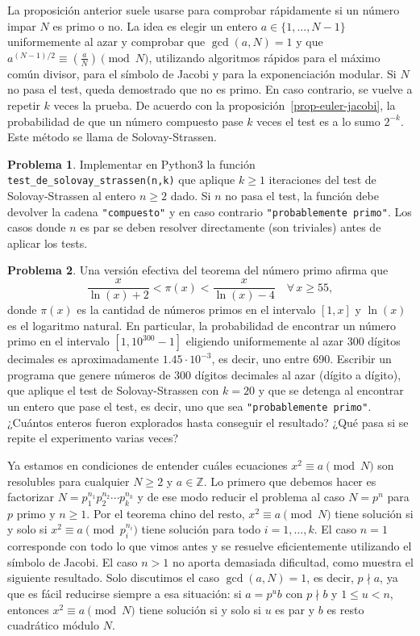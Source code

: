 \documentclass[a4paper, 11pt]{article}
\newcommand{\ZZ}{\mathbb{Z}}
\newcounter{numerodetema}
\theoremstyle{plain}
\theoremstyle{definition}
\newtheorem{prob}{Problema}[numerodetema]
\begin{document}
La proposición anterior suele usarse para comprobar rápidamente si
un número impar $N$ es primo o no. La idea es elegir un entero
$a\in\{1,\ldots,N-1\}$ uniformemente al azar y comprobar que $\gcd(a,N)=1$
y que $a^{(N-1)/2}\equiv\left(\frac{a}{N}\right)\pmod{N}$, utilizando
algoritmos rápidos para el máximo común divisor, para el símbolo de Jacobi
y para la exponenciación modular. Si $N$ no pasa el test, queda demostrado
que no es primo. En caso contrario, se vuelve a repetir $k$ veces la
prueba. De acuerdo con la proposición~\ref{prop-euler-jacobi}, la probabilidad
de que un número compuesto pase $k$ veces el test es a lo sumo $2^{-k}$.
Este método se llama de Solovay-Strassen.

\begin{prob}
Implementar en Python3 la función \texttt{test\_de\_solovay\_strassen(n,k)}
que aplique $k\geq1$ iteraciones del test de Solovay-Strassen al entero
$n\geq2$ dado. Si $n$ no pasa el test, la función debe devolver la cadena
\texttt{"compuesto"} y en caso contrario \texttt{"probablemente primo"}.
Los casos donde $n$ es par se deben resolver directamente (son triviales)
antes de aplicar los tests.
\end{prob}

\begin{prob}
Una versión efectiva del teorema del número primo afirma que
\[
\frac{x}{\ln(x)+2}<\pi(x)<\frac{x}{\ln(x)-4}\quad\forall\,x\geq 55,
\]
donde $\pi(x)$ es la cantidad de números primos en el intervalo $[1,x]$
y $\ln(x)$ es el logaritmo natural. En particular, la probabilidad de
encontrar un número primo en el intervalo $[1,10^{300}-1]$ eligiendo
uniformemente al azar $300$ dígitos decimales es aproximadamente
$1.45\cdot 10^{-3}$, es decir, uno entre 690. Escribir un programa
que genere números de $300$ dígitos decimales al azar (dígito a
dígito), que aplique el test de Solovay-Strassen con $k=20$ y que se
detenga al encontrar un entero que pase el test, es decir, uno que
sea \texttt{"probablemente primo"}. ¿Cuántos enteros fueron explorados
hasta conseguir el resultado? ¿Qué pasa si se repite el experimento
varias veces?
\end{prob}

Ya estamos en condiciones de entender cuáles ecuaciones $x^2\equiv a\pmod{N}$
son resolubles para cualquier $N\geq 2$ y $a\in\ZZ$. Lo primero
que debemos hacer es factorizar $N=p_1^{n_1}p_2^{n_2}\cdots p_k^{n_k}$ y de
ese modo reducir el problema al caso $N=p^n$ para $p$ primo y $n\geq 1$.
Por el teorema chino del resto, $x^2\equiv a\pmod{N}$ tiene solución
si y solo si $x^2\equiv a\pmod{p_i^{n_i}}$ tiene solución para todo
$i=1,\ldots,k$. El caso $n=1$ corresponde con todo lo que vimos antes y se
resuelve eficientemente utilizando el símbolo de Jacobi. El caso $n>1$ no
aporta demasiada dificultad, como muestra el siguiente resultado. Solo
discutimos el caso $\gcd(a,N)=1$, es decir, $p\nmid a$, ya que es fácil
reducirse siempre a esa situación: si $a=p^ub$ con $p\nmid b$ y $1\leq u<n$,
entonces $x^2\equiv a\pmod{N}$ tiene solución si y solo si $u$ es par y $b$
es resto cuadrático módulo $N$.
\end{document}
